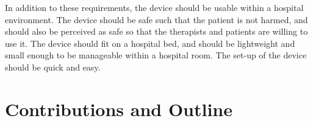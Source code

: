 \documentclass[12pt]{report}
\begin{document}
In addition to these requirements, the device should be usable within a hospital environment. The device should be safe such that the patient is not harmed, and should also be perceived as safe so that the therapists and patients are willing to use it. The device should fit on a hospital bed, and should be lightweight and small enough to be manageable within a hospital room. The set-up of the device should be quick and easy.








\section{Contributions and Outline}
\end{document}
